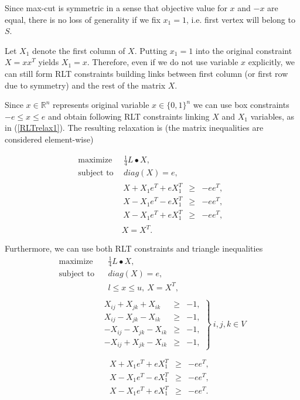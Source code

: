 \documentclass[12pt]{book}
\theoremstyle{definition}
\begin{document}
Since max-cut is symmetric in a sense that objective value for $x$ and $-x$ are equal, there is no loss of generality if we fix $x_1 = 1$, i.e. first vertex will belong to $S$. 

Let $X_1$ denote the first column of $X$. Putting $x_1 = 1$ into the original constraint $X = xx^T$ yields $X_1 = x$.
Therefore, even if we do not use variable $x$ explicitly, we can still form RLT constraints building links between first column (or first row due to symmetry) and the rest of the matrix $X$.


Since $x\in \mathbb{R}^n$ represents original variable $x\in \{0,1\}^n$ we can use box constraints 
$-e \leq x \leq e$
and obtain following RLT constraints linking $X$ and $X_1$ variables, as in (\ref{RLTrelax1}).
The resulting relaxation is (the matrix inequalities are considered element-wise)


\begin{equation}
\label{MaxCutLPRelaxRLT}
\begin{array}{ll}
\mbox{maximize} & \ \ \frac{1}{4}L\bullet X, \\
\mbox{subject to} & \ \ diag(X) = e , \\
		& \begin{array}{lcl}
		 X + X_1e^T + eX_1^T & \geq & -ee^T, \\
		 X - X_1e^T - eX_1^T & \geq & -ee^T, \\
		 X - X_1e^T + eX_1^T & \geq & -ee^T,
	\end{array}\\
 		&\  X=X^T.
\end{array}
\end{equation} 

Furthermore, we can use both RLT constraints and triangle inequalities
\begin{equation}
\label{MaxCutLPRelaxRLT+triangle}
\begin{array}{ll}
\mbox{maximize} & \ \ \ \ \frac{1}{4}L\bullet X, \\
\mbox{subject to} & \ \ \ \ diag(X) = e ,\\
& \ \ \ \ l\leq x \leq u,\ X=X^T, \\
& \\
& \left.\begin{array}{rcl}
X_{ij} + X_{jk} + X_{ik} &\geq & -1, \\
X_{ij} - X_{jk} - X_{ik} &\geq & -1, \\
- X_{ij} - X_{jk} - X_{ik} &\geq & -1, \\
- X_{ij} + X_{jk} - X_{ik} &\geq & -1,
\end{array}\right\rbrace \ i,j,k \in V \\
& \\
		& \ \ \ \begin{array}{lcl}
		 X + X_1e^T + eX_1^T & \geq & -ee^T, \\
		 X - X_1e^T - eX_1^T & \geq & -ee^T, \\
		 X - X_1e^T + eX_1^T & \geq & -ee^T.
	\end{array}
\end{array}
\end{equation} 
\end{document}
